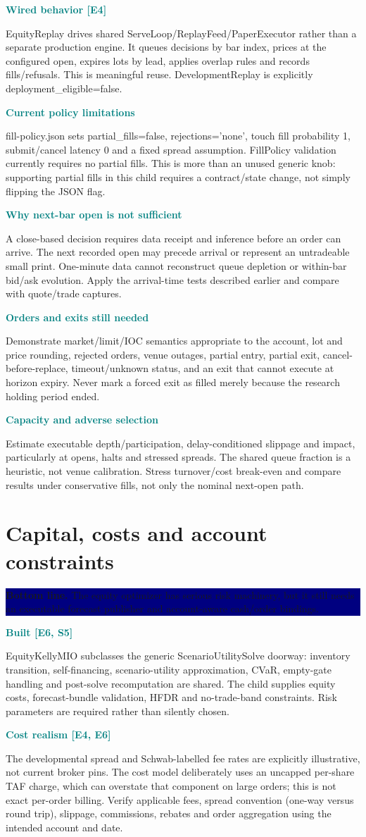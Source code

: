\documentclass[10pt,letterpaper]{article}
\newcommand{\bl}[1]{\noindent\colorbox{navy}{\parbox{\dimexpr\linewidth-2\fboxsep}{\color{white}\textbf{Bottom line.} #1}}\par\medskip}
\newcommand{\topic}[2]{\clearpage\section{#1}\bl{#2}}
\newcommand{\sub}[1]{\par\textbf{\textcolor{teal}{#1}}\par}
\begin{document}
\sub{Wired behavior [E4]}
EquityReplay drives shared ServeLoop/ReplayFeed/PaperExecutor rather than a separate production engine. It queues decisions by bar index, prices at the configured open, expires lots by lead, applies overlap rules and records fills/refusals. This is meaningful reuse. DevelopmentReplay is explicitly deployment\_eligible=false.
\sub{Current policy limitations}
fill-policy.json sets partial\_fills=false, rejections='none', touch fill probability 1, submit/cancel latency 0 and a fixed spread assumption. FillPolicy validation currently requires no partial fills. This is more than an unused generic knob: supporting partial fills in this child requires a contract/state change, not simply flipping the JSON flag.
\sub{Why next-bar open is not sufficient}
A close-based decision requires data receipt and inference before an order can arrive. The next recorded open may precede arrival or represent an untradeable small print. One-minute data cannot reconstruct queue depletion or within-bar bid/ask evolution. Apply the arrival-time tests described earlier and compare with quote/trade captures.
\sub{Orders and exits still needed}
Demonstrate market/limit/IOC semantics appropriate to the account, lot and price rounding, rejected orders, venue outages, partial entry, partial exit, cancel-before-replace, timeout/unknown status, and an exit that cannot execute at horizon expiry. Never mark a forced exit as filled merely because the research holding period ended.
\sub{Capacity and adverse selection}
Estimate executable depth/participation, delay-conditioned slippage and impact, particularly at opens, halts and stressed spreads. The shared queue fraction is a heuristic, not venue calibration. Stress turnover/cost break-even and compare results under conservative fills, not only the nominal next-open path.
\topic{Capital, costs and account constraints}{The equity optimizer has serious risk machinery, but it still needs an executable forecast publisher and account-aware cash/order bindings.}
\sub{Built [E6, S5]}
EquityKellyMIO subclasses the generic ScenarioUtilitySolve doorway: inventory transition, self-financing, scenario-utility approximation, CVaR, empty-gate handling and post-solve recomputation are shared. The child supplies equity costs, forecast-bundle validation, HFDR and no-trade-band constraints. Risk parameters are required rather than silently chosen.
\sub{Cost realism [E4, E6]}
The developmental spread and Schwab-labelled fee rates are explicitly illustrative, not current broker pins. The cost model deliberately uses an uncapped per-share TAF charge, which can overstate that component on large orders; this is not exact per-order billing. Verify applicable fees, spread convention (one-way versus round trip), slippage, commissions, rebates and order aggregation using the intended account and date.
\end{document}
